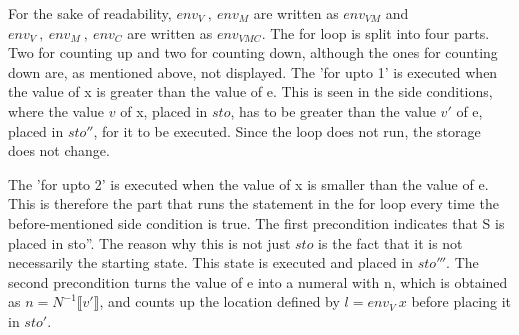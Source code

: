For the sake of readability, \(env_V\: ,\ env_M\) are written as \(env_{VM}\) and \(env_V\: ,\ env_M\: ,\ env_C\) are written as \(env_{VMC}\). The for loop is split into four parts. Two for counting up and two for counting down, although the ones for counting down are, as mentioned above, not displayed. The 'for upto 1' is executed when the value of x is greater than the value of e. This is seen in the side conditions, where the value \(v\) of x, placed in \(sto\), has to be greater than the value \(v'\) of e, placed in \(sto''\), for it to be executed. Since the loop does not run, the storage does not change. 

The 'for upto 2' is executed when the value of x is smaller than the value of e. This is therefore the part that runs the statement in the for loop every time the before-mentioned side condition is true. The first precondition indicates that S is placed in sto''. The reason why this is not just \(sto\) is the fact that it is not necessarily the starting state. This state is executed and placed in \(sto'''\). The second precondition turns the value of e into a numeral with n, which is obtained as \(n = N^{-1}\llbracket v' \rrbracket \), and counts up the location defined by \(l = env_V\ x\) before placing it in \(sto'\).



